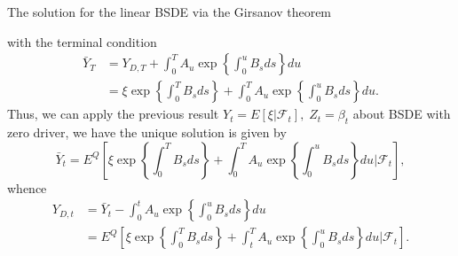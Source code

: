 \documentclass{beamer}
\begin{document}
\begin{frame}{The solution for the linear BSDE via the Girsanov theorem}

    {\footnotesize \footnotesize
    with the terminal condition
    \begin{align*}
        \bar{Y}_T &= Y_{D,T} + \int_0^T A_u \exp \left\{ \int_0^u B_s ds \right\} du\\
        &= \xi \exp \left\{ \int_0^T B_s ds \right\} + \int_0^T A_u 
\exp \left\{ \int_0^u B_s ds \right\} du.
    \end{align*}
    Thus, we can apply the previous result 
    $Y_t = E[\xi|\mathcal{F}_t], \;Z_t = \beta_t$ about BSDE with zero driver, we have the unique solution is given by
\[
\bar{Y}_t = E^Q \left[ \xi \exp \left\{ \int_0^T B_s ds \right\} + \int_0^T A_u \exp \left\{ \int_0^u B_s ds \right\} du | \mathcal{F}_t \right],
\]
whence
\begin{align*}
    Y_{D,t} &= \bar{Y}_t - \int_0^t A_u \exp \left\{ \int_0^u B_s ds \right\} du\\
    &= E^Q \left[ \xi \exp \left\{ \int_0^T B_s ds \right\} +
 \int_t^T A_u \exp \left\{ \int_0^u B_s ds \right\} du | \mathcal{F}_t \right].
\end{align*}
    }
    
\end{frame}
\end{document}
